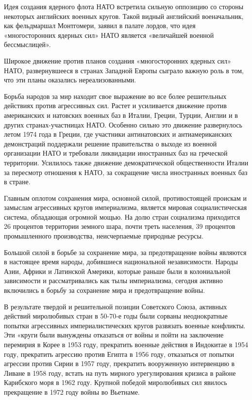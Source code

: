 \documentclass[12pt, a4paper, openany]{book}
\begin{document}
	Идея создания ядерного флота НАТО встретила сильную оппозицию со стороны некоторых английских военных кругов. Такой видный английский военачальник, как фельдмаршал Монтгомери, заявил в палате лордов, что идея «многосторонних ядерных сил» НАТО является «величайшей военной бессмыслицей».
	
	Широкое движение против планов создания «многосторонних ядерных сил» НАТО, развернувшееся в странах Западной Европы сыграло важную роль в том, что эти планы оказались нереализованными.
	
	Борьба народов за мир находит свое выражение во все более решительных действиях против агрессивных сил. Растет и усиливается движение против американских и натовских военных баз в Италии, Греции, Турции, Англии и в других странах-участницах НАТО. Особенно сильно это движение развернулось летом 1974 года в Греции, где участники антинатовских и антиамериканских демонстраций поддержали решение правительства о выходе из военной организации НАТО и требовали ликвидации иностранных баз на греческой территории. Усилилось также движение демократической общественности Италии за пересмотр отношения к НАТО, за сокращение числа иностранных военных баз в стране.
	
	Главным оплотом сохранения мира, основной силой, противостоящей проискам и замыслам агрессивных кругов империализма, является мировая социалистическая система, обладающая огромной мощью. На долю стран социализма приходится 26 процентов территории земного шара, почти треть населения, 39 процентов промышленного производства, неисчерпаемые природные ресурсы.
	
	Большой силой в борьбе за сохранение мира, за предотвращение войны являются в настоящее время народы, добившиеся национальной независимости. Народы Азии, Африки и Латинской Америки, которые раньше были в колониальной зависимости и рассматривались как тылы империализма, сегодня активно включились в борьбу за сохранение мира и предотвращение войны.
	
	В результате твердой и решительной позиции Советского Союза, активных действий миролюбивых стран в 50-70-е годы были сорваны неоднократные попытки агрессивных империалистических кругов развязать военные конфликты. Эти «круги были вынуждены отказаться от войны и пойти на заключение перемирия в Корее в 1953 году, прекратить военные действия в Индокитае в 1954 году, прекратить агрессию против Египта в 1956 году, отказаться от попытки агрессии против Сирии в 1957 году, прекратить вооруженную интервенцию в Ливане в 1958 году, встать на путь мирного урегулирования кризиса в районе Карибского моря в 1962 году. Крупной победой миролюбивых сил явилось прекращение в 1972 году войны во Вьетнаме.
	
\end{document}
